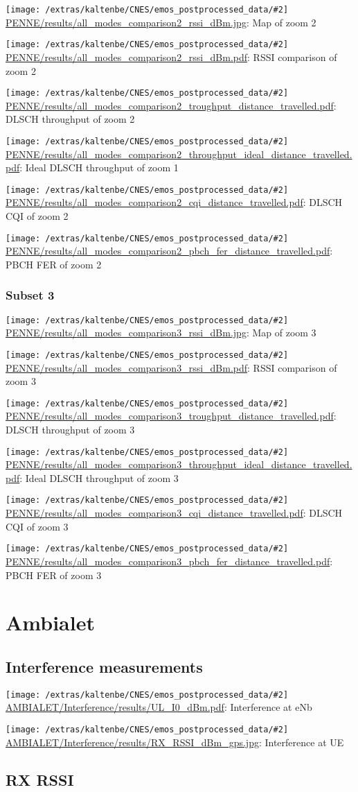 \documentclass[a4paper,10pt]{article}
\newcommand{\printfile}[2][]{
 \begin{minipage}{8cm}
  \centering
  \texttt{[image: /extras/kaltenbe/CNES/emos\_postprocessed\_data/\#2]}
  \url{#2}: #1

 \end{minipage}
}
\begin{document}
\printfile[Map of zoom 2]{PENNE/results/all_modes_comparison2_rssi_dBm.jpg}
\printfile[RSSI comparison of zoom 2]{PENNE/results/all_modes_comparison2_rssi_dBm.pdf}

\printfile[DLSCH throughput of zoom 2]{PENNE/results/all_modes_comparison2_troughput_distance_travelled.pdf}
\printfile[Ideal DLSCH throughput of zoom 1]{PENNE/results/all_modes_comparison2_throughput_ideal_distance_travelled.pdf}

\printfile[DLSCH CQI of zoom 2]{PENNE/results/all_modes_comparison2_cqi_distance_travelled.pdf}
\printfile[PBCH FER of zoom 2]{PENNE/results/all_modes_comparison2_pbch_fer_distance_travelled.pdf}

\subsubsection*{Subset 3}

\printfile[Map of zoom 3]{PENNE/results/all_modes_comparison3_rssi_dBm.jpg}
\printfile[RSSI comparison of zoom 3]{PENNE/results/all_modes_comparison3_rssi_dBm.pdf}

\printfile[DLSCH throughput of zoom 3]{PENNE/results/all_modes_comparison3_troughput_distance_travelled.pdf}
\printfile[Ideal DLSCH throughput of zoom 3]{PENNE/results/all_modes_comparison3_throughput_ideal_distance_travelled.pdf}

\printfile[DLSCH CQI of zoom 3]{PENNE/results/all_modes_comparison3_cqi_distance_travelled.pdf}
\printfile[PBCH FER of zoom 3]{PENNE/results/all_modes_comparison3_pbch_fer_distance_travelled.pdf}


\section{Ambialet}
\label{sec:ambialet}

\subsection{Interference measurements}

\printfile[Interference at eNb]{AMBIALET/Interference/results/UL_I0_dBm.pdf}
\printfile[Interference at UE]{AMBIALET/Interference/results/RX_RSSI_dBm_gps.jpg}


\subsection{RX RSSI}


% 
\end{document}
